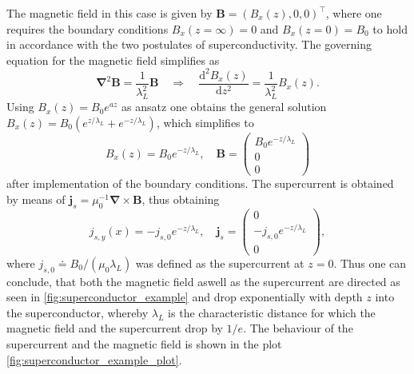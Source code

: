 \documentclass{report}
\numberwithin{tm}{section}
\newcommand\vect[1]{\ensuremath{\bm{#1}}}
\begin{document}
The magnetic field in this case is given by $\vect{B} = (B_x(z),0,0)^\top$, where one requires the boundary conditions $B_x(z=\infty)=0$ and $B_x(z=0)=B_0$ to hold in accordance with the two postulates of superconductivity. The governing equation for the magnetic field simplifies as \begin{equation}
	\vect{\nabla}^2\vect{B} = \frac{1}{\lambda_L^2}\vect{B} \quad \Rightarrow \quad \frac{\mathrm{d}^2B_x(z)}{\mathrm{d}z^2} = \frac{1}{\lambda_L^2}B_x(z).
\end{equation} Using $B_x(z) = B_0e^{az}$ as ansatz one obtains the general solution $B_x(z) = B_0(e^{z/\lambda_L}+e^{-z/\lambda_L})$, which simplifies to \begin{equation}
B_x(z) = B_0e^{-z/\lambda_L}, \quad \vect{B} = \begin{pmatrix}
	B_0 e^{-z/\lambda_L} \\ 0 \\ 0
\end{pmatrix}
\end{equation} after implementation of the boundary conditions. The supercurrent is obtained by means of $\vect{j}_s = \mu_0^{-1}\vect{\nabla} \times \vect{B}$, thus obtaining \begin{equation}
j_{s,y}(x) = -j_{s,0}e^{-z/\lambda_L}, \quad \vect{j}_s = \begin{pmatrix}
	0 \\ -j_{s,0}e^{-z/\lambda_L} \\ 0
\end{pmatrix},
\end{equation} where $j_{s,0} \doteq B_0/(\mu_0\lambda_L)$ was defined as the supercurrent at $z=0$. Thus one can conclude, that both the magnetic field aswell as the supercurrent are directed as seen in \cref{fig:superconductor_example} and drop exponentially with depth $z$ into the superconductor, whereby $\lambda_L$ is the characteristic distance for which the magnetic field and the supercurrent drop by $1/e$. The behaviour of the supercurrent and the magnetic field is shown in the plot \cref{fig:superconductor_example_plot}.

\end{document}

